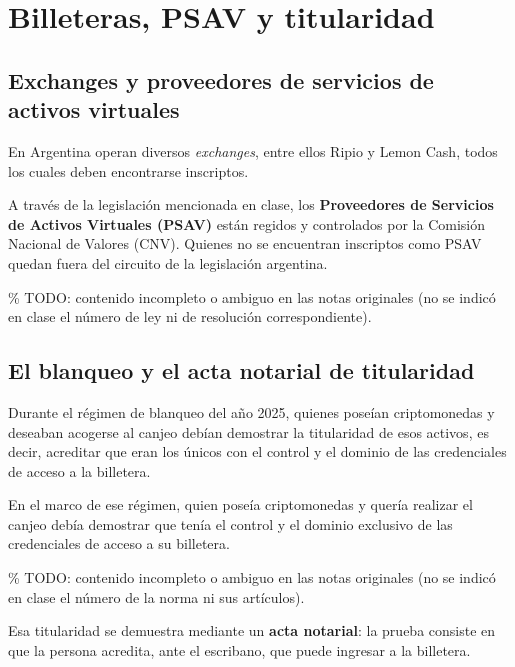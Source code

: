 \documentclass[12pt,oneside]{book}
\begin{document}
\chapter{Billeteras, PSAV y titularidad}

\section{Exchanges y proveedores de servicios de activos virtuales}

En Argentina operan diversos \textit{exchanges}, entre ellos Ripio y Lemon Cash, todos los cuales deben encontrarse inscriptos.

\begin{important}
A través de la legislación mencionada en clase, los \textbf{Proveedores de Servicios de Activos Virtuales (PSAV)} están regidos y controlados por la Comisión Nacional de Valores (CNV). Quienes no se encuentran inscriptos como PSAV quedan fuera del circuito de la legislación argentina.

\% TODO: contenido incompleto o ambiguo en las notas originales (no se indicó en clase el número de ley ni de resolución correspondiente).
\end{important}

\section{El blanqueo y el acta notarial de titularidad}

Durante el régimen de blanqueo del año 2025, quienes poseían criptomonedas y deseaban acogerse al canjeo debían demostrar la titularidad de esos activos, es decir, acreditar que eran los únicos con el control y el dominio de las credenciales de acceso a la billetera.

\begin{important}
En el marco de ese régimen, quien poseía criptomonedas y quería realizar el canjeo debía demostrar que tenía el control y el dominio exclusivo de las credenciales de acceso a su billetera.

\% TODO: contenido incompleto o ambiguo en las notas originales (no se indicó en clase el número de la norma ni sus artículos).
\end{important}

Esa titularidad se demuestra mediante un \textbf{acta notarial}: la prueba consiste en que la persona acredita, ante el escribano, que puede ingresar a la billetera.
\end{document}
